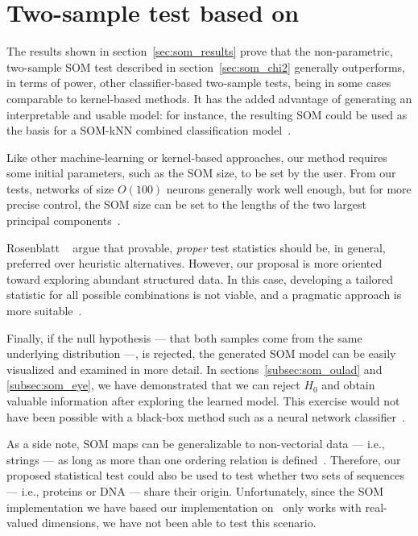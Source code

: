\section{Two-sample test based on }
\label{sec:discuss_som}
The results shown in section~\ref{sec:som_results} prove that the non-parametric,
two-sample \gls{SOM} test described in section~\ref{sec:som_chi2} generally outperforms,
in terms of power, other classifier-based two-sample tests, being in some cases
comparable to kernel-based methods. It has the added advantage of generating an
interpretable and usable model: for instance, the resulting \gls{SOM} could be used
as the basis for a \gls{SOM}-\gls{kNN} combined classification model~\cite{silva2011som}.

Like other machine-learning or kernel-based approaches, our method requires some
initial parameters, such as the \gls{SOM} size, to be set by the user. From our
tests, networks of size $O(100)$ neurons generally work well enough, but for more
precise control, the \gls{SOM} size can be set to the lengths of the two largest
principal components~\cite{KOHONEN201352}.

Rosenblatt \etal~\cite{rosenblatt2021better} argue that provable, \emph{proper} test statistics
should be, in general, preferred over heuristic alternatives. However, our
proposal is more oriented toward exploring abundant structured data. In this
case, developing a tailored statistic for all possible combinations is not viable,
and a pragmatic approach is more suitable~\cite{kim2021classification}.

Finally, if the null hypothesis --- that both samples come from the same underlying
distribution ---, is rejected, the generated \gls{SOM}  model can be easily visualized
and examined in more detail.
In sections~\ref{subsec:som_oulad} and \ref{subsec:som_eye}, we have demonstrated
that we can reject $H_0$ and obtain valuable information after exploring the learned model.
This exercise would not have been possible with a black-box method such as
a neural network classifier~\cite{friedman2004multivariate}.


As a side note, \gls{SOM} maps can be generalizable to non-vectorial data
--- i.e., strings --- as long as more than one ordering relation is
defined~\cite{kohonen1982self, KOHONEN201352}.
Therefore, our proposed statistical test could also be used to test whether
two sets of sequences --- i.e., proteins or DNA --- share their origin.
Unfortunately, since the \gls{SOM} implementation we have based our implementation
on~\cite{wittek2013somoclu} only works with real-valued dimensions, we have not been
able to test this scenario.


